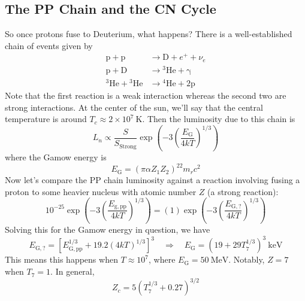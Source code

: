 \documentclass[10pt]{article}
\numberwithin{equation}{section}
\begin{document}
  \subsection{The PP Chain and the CN Cycle}
  \label{sec:pp-chain}

  So once protons fuse to Deuterium, what happens? There is a
  well-established chain of events given by
  \begin{align}
    \label{eq:164}
    \mathrm{p+p}&\to \mathrm{D+}e^++\nu_e\\
    \label{eq:164a}
    \mathrm{p+D} &\to\mathrm{{}^3He+\gamma}\\
    \label{eq:164b}
    \mathrm{{}^3He+{}^3He}&\to \mathrm{{}^4He+2p}
  \end{align}
  Note that the first reaction is a weak interaction whereas the
  second two are strong interactions. At the center of the sun, we'll
  say that the central temperature is around $T_c\approx 2\times 10^7\
  \mathrm{K}$. Then the luminosity due to this chain is
  \begin{equation}
    \label{eq:165}
    L_n\propto \frac{S}{S_{\mathrm{Strong}}}\exp\left(-3\left(\frac{E_\mathrm{G}}{4kT}\right)^{1/3}\right)
  \end{equation}
  where the Gamow energy is
  \begin{equation}
    \label{eq:166}
    E_{\mathrm{G}}=\left(\pi\alpha Z_1Z_2\right)^22m_rc^2
  \end{equation}
  Now let's compare the PP chain luminosity against a reaction
  involving fusing a proton to some heavier nucleus with atomic number
  $Z$ (a strong reaction):
  \begin{equation}
    \label{eq:167}
    10^{-25}\exp\left(-3\left(\frac{E_{\mathrm{g,pp}}}{4kT}\right)^{1/3}\right)=(1)\exp\left(-3\left(\frac{E_{\mathrm{G,?}}}{4kT}\right)^{1/3}\right)
  \end{equation}
  Solving this for the Gamow energy in question, we have
  \begin{equation}
    \label{eq:168}
    E_{\mathrm{G,?}}=\left[E_{\mathrm{G,pp}}^{1/3}+19.2(4kT)^{1/3}\right]^{3}\quad
    \Rightarrow \quad E_{\mathrm{G}}=\left(19+29 T_7^{1/3}\right)^{3}\ \mathrm{keV}
  \end{equation}
  This means this happens when $T\approx 10^7$, where
  $E_{\mathrm{G}}=50\ \mathrm{MeV}$. Notably, $Z=7$ when $T_7=1$. In
  general, 
  \begin{equation}
    \label{eq:169}
    \boxed{Z_c=5\left(T_7^{1/3}+0.27\right)^{3/2}}
  \end{equation}
\end{document}
